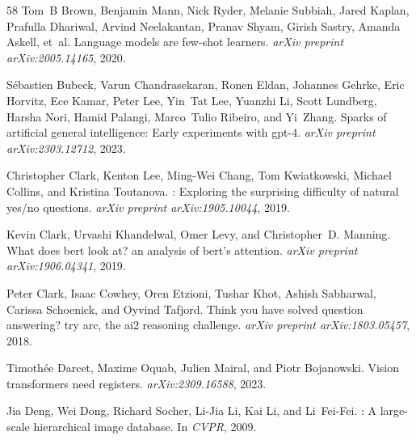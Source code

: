 \documentclass[10pt]{article}
\theoremstyle{definition}
\theoremstyle{plain}
\begin{document}
\begin{thebibliography}{58}
Tom~B Brown, Benjamin Mann, Nick Ryder, Melanie Subbiah, Jared Kaplan, Prafulla Dhariwal, Arvind Neelakantan, Pranav Shyam, Girish Sastry, Amanda Askell, et~al.
\newblock Language models are few-shot learners.
\newblock \emph{arXiv preprint arXiv:2005.14165}, 2020.

Sébastien Bubeck, Varun Chandrasekaran, Ronen Eldan, Johannes Gehrke, Eric Horvitz, Ece Kamar, Peter Lee, Yin~Tat Lee, Yuanzhi Li, Scott Lundberg, Harsha Nori, Hamid Palangi, Marco~Tulio Ribeiro, and Yi~Zhang.
\newblock Sparks of artificial general intelligence: Early experiments with gpt-4.
\newblock \emph{arXiv preprint arXiv:2303.12712}, 2023.

Christopher Clark, Kenton Lee, Ming-Wei Chang, Tom Kwiatkowski, Michael Collins, and Kristina Toutanova.
: Exploring the surprising difficulty of natural yes/no questions.
\newblock \emph{arXiv preprint arXiv:1905.10044}, 2019{}.

Kevin Clark, Urvashi Khandelwal, Omer Levy, and Christopher~D. Manning.
\newblock What does bert look at? an analysis of bert's attention.
\newblock \emph{arXiv preprint arXiv:1906.04341}, 2019{}.

Peter Clark, Isaac Cowhey, Oren Etzioni, Tushar Khot, Ashish Sabharwal, Carissa Schoenick, and Oyvind Tafjord.
\newblock Think you have solved question answering? try arc, the ai2 reasoning challenge.
\newblock \emph{arXiv preprint arXiv:1803.05457}, 2018.

Timothée Darcet, Maxime Oquab, Julien Mairal, and Piotr Bojanowski.
\newblock Vision transformers need registers.
\newblock \emph{arXiv:2309.16588}, 2023.

Jia Deng, Wei Dong, Richard Socher, Li-Jia Li, Kai Li, and Li~Fei-Fei.
: A large-scale hierarchical image database.
\newblock In \emph{CVPR}, 2009.


\end{thebibliography}
\end{document}
